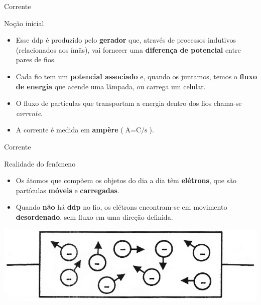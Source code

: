 \begin{frame}{Corrente}
	\begin{block}{Noção inicial}
		\begin{itemize}
			\item Esse ddp é produzido pelo \textbf{gerador} que, através de processos indutivos (relacionados aos ímãs), vai fornecer uma \textbf{diferença de potencial} entre pares de fios.
			\item Cada fio tem um \textbf{potencial associado} e, quando os juntamos, temos o \textbf{fluxo de energia} que acende uma lâmpada, ou carrega um celular.
			\item O fluxo de partículas que transportam a energia dentro dos fios chama-se \textit{corrente}.
			\item A corrente é medida em \textbf{ampère} ($ \si{\ampere}=\si{\coulomb\per\second} $).
		\end{itemize}
	\end{block}
\end{frame}


\begin{frame}{Corrente}
	\begin{block}{Realidade do fenômeno}
		\begin{itemize}
			\item Os átomos que compõem os objetos do dia a dia têm \textbf{elétrons}, que são partículas \textbf{móveis} e \textbf{carregadas}.
			\item Quando \textbf{não} há \textbf{ddp} no fio, os elétrons encontram-se em movimento \textbf{desordenado}, sem fluxo em uma direção definida.
		\end{itemize}
	\end{block}

	\bigskip

	\centering
	\includegraphics[width=0.65\linewidth]{Figuras/Ch01/fig8.1}

\end{frame}


